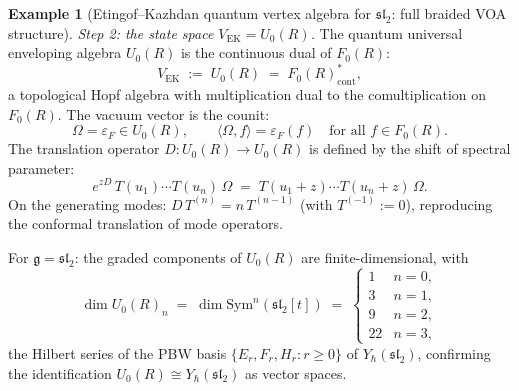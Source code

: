 \documentclass[11pt,reqno]{amsart}
\theoremstyle{definition}
\newtheorem{example}[theorem]{Example}
\theoremstyle{remark}
\newcommand{\Sym}{\mathrm{Sym}}
\newcommand{\fg}{\mathfrak{g}}
\numberwithin{equation}{section}
\begin{document}
\begin{example}[Etingof--Kazhdan quantum vertex algebra for
$\mathfrak{sl}_2$: full braided VOA structure]
\smallskip
\noindent\emph{Step 2: the state space $V_{\mathrm{EK}}
= U_0(R)$.}
The quantum universal enveloping algebra $U_0(R)$ is the
continuous dual of $F_0(R)$:
\begin{equation}\label{eq:ek-state-space}
  V_{\mathrm{EK}}
  \;:=\; U_0(R)
  \;=\; F_0(R)^*_{\mathrm{cont}},
\end{equation}
a topological Hopf algebra with multiplication dual to the
comultiplication on $F_0(R)$. The vacuum vector is the
counit:
\begin{equation}\label{eq:ek-vacuum}
  \Omega = \varepsilon_F \in U_0(R),
  \qquad
  \langle \Omega, f \rangle = \varepsilon_F(f)
  \quad \text{for all } f \in F_0(R).
\end{equation}
The translation operator $D \colon U_0(R) \to U_0(R)$ is
defined by the shift of spectral parameter:
\begin{equation}\label{eq:ek-translation}
  e^{z D}\, T(u_1) \cdots T(u_n)\, \Omega
  \;=\;
  T(u_1 + z) \cdots T(u_n + z)\, \Omega.
\end{equation}
On the generating modes: $D\,T^{(n)} = n\,T^{(n-1)}$
(with $T^{(-1)} := 0$), reproducing the conformal translation
of mode operators.

For $\fg = \mathfrak{sl}_2$: the graded components of
$U_0(R)$ are finite-dimensional, with
\begin{equation}\label{eq:ek-hilbert}
  \dim U_0(R)_n
  \;=\; \dim \Sym^n(\mathfrak{sl}_2[t])
  \;=\;
  \begin{cases}
  1 & n = 0, \\
  3 & n = 1, \\
  9 & n = 2, \\
  22 & n = 3,
  \end{cases}
\end{equation}
the Hilbert series of the PBW basis
$\{E_r, F_r, H_r : r \geq 0\}$ of
$Y_\hbar(\mathfrak{sl}_2)$, confirming the identification
$U_0(R) \cong Y_\hbar(\mathfrak{sl}_2)$ as vector spaces.


\end{example}
\end{document}
